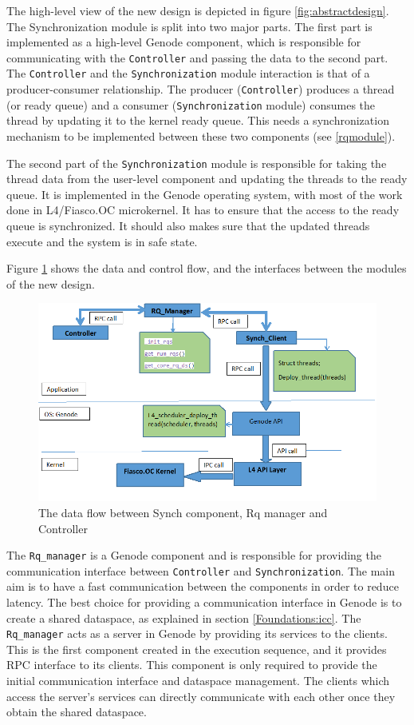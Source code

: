 The high-level view of the new design is depicted in figure \ref{fig:abstractdesign}.
The Synchronization module is split into two major parts. The first part is implemented as a high-level Genode component, which is responsible for communicating with the \texttt{Controller} and passing the data to the second part. The \texttt{Controller} and the \texttt{Synchronization} module interaction is that of a producer-consumer relationship. The producer (\texttt{Controller}) produces a thread (or ready queue) and a consumer (\texttt{Synchronization} module) consumes the thread by updating it to the kernel ready queue. This needs a synchronization mechanism to be implemented between these two components (see \ref{rqmodule}).

The second part of the \texttt{Synchronization} module is responsible for taking the thread data from the user-level component and updating the threads to the ready queue. It is implemented in the Genode operating system, with most of the work done in L4/Fiasco.OC microkernel. It has to ensure that the access to the ready queue is synchronized. It should also makes sure that the updated threads execute and the system is in safe state.

Figure \ref{fig:Design_25} shows the data and control flow, and the interfaces between the modules of the new design.

\begin{figure}[h]
\centering
\includegraphics[width=1.0\linewidth]{figures/Design_25.png}
\caption{The data flow between Synch component, Rq manager and Controller}
\label{fig:Design_25}
\end{figure}

The \texttt{Rq\_manager} is a Genode component and is responsible for providing the communication interface between \texttt{Controller} and \texttt{Synchronization}. The main aim is to have a fast communication between the components in order to reduce latency. The best choice for providing a communication interface in Genode is to create a shared dataspace, as explained in section \ref{Foundations:icc}. The \texttt{Rq\_manager} acts as a server in Genode by providing its services to the clients. This is the first component created in the execution sequence, and it provides RPC interface to its clients. This component is only required to provide the initial communication interface and dataspace management. The clients which access the server's services can directly communicate with each other once they obtain the shared dataspace. 

